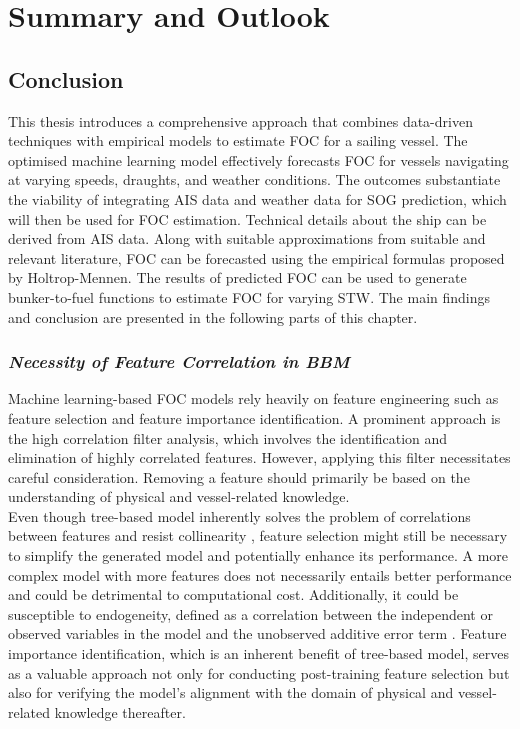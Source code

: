 \chapter{Summary and Outlook} \label{chp:outlook}

\section{Conclusion}\label{sec:conclusion}

This thesis introduces a comprehensive approach that combines data-driven techniques with empirical models to estimate FOC for a sailing vessel. The optimised machine learning model effectively forecasts FOC for vessels navigating at varying speeds, draughts, and weather conditions. The outcomes substantiate the viability of integrating AIS data and weather data for SOG prediction, which will then be used for FOC estimation. Technical details about the ship can be derived from AIS data. Along with suitable approximations from suitable and relevant literature, FOC can be forecasted using the empirical formulas proposed by Holtrop-Mennen. The results of predicted FOC can be used to generate bunker-to-fuel functions to estimate FOC for varying STW. The main findings and conclusion are presented in the following parts of this chapter.\\

\subsection*{\emph{Necessity of Feature Correlation in BBM}}

Machine learning-based FOC models rely heavily on feature engineering such as feature selection and feature importance identification. A prominent approach is the high correlation filter analysis, which involves the identification and elimination of highly correlated features. However, applying this filter necessitates careful consideration. Removing a feature should primarily be based on the understanding of physical and vessel-related knowledge.\\

Even though tree-based model inherently solves the problem of correlations between features and resist collinearity , feature selection might still be necessary to simplify the generated model and potentially enhance its performance. A more complex model with more features does not necessarily entails better performance and could be detrimental to computational cost. Additionally, it could be susceptible to endogeneity, defined as a correlation between the independent or observed variables in the model and the unobserved additive error term . Feature importance identification, which is an inherent benefit of tree-based model, serves as a valuable approach not only for conducting post-training feature selection but also for verifying the model's alignment with the domain of physical and vessel-related knowledge thereafter.\\ 


